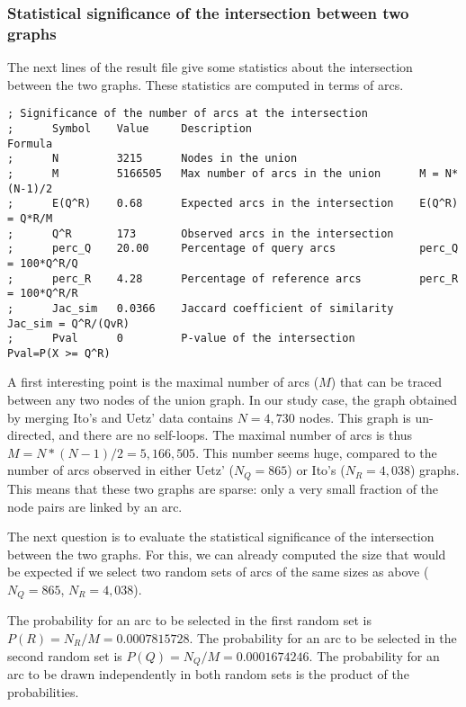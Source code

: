 \begin{enumerate}
\subsubsection{Statistical significance of the intersection between two graphs}

The next lines of the result file give some statistics about the
intersection between the two graphs. These statistics are computed in
terms of arcs.

\begin{footnotesize}
\begin{verbatim}
; Significance of the number of arcs at the intersection
;      Symbol    Value     Description                          Formula
;      N         3215      Nodes in the union                  
;      M         5166505   Max number of arcs in the union      M = N*(N-1)/2
;      E(Q^R)    0.68      Expected arcs in the intersection    E(Q^R) = Q*R/M
;      Q^R       173       Observed arcs in the intersection
;      perc_Q    20.00     Percentage of query arcs             perc_Q = 100*Q^R/Q
;      perc_R    4.28      Percentage of reference arcs         perc_R = 100*Q^R/R
;      Jac_sim   0.0366    Jaccard coefficient of similarity    Jac_sim = Q^R/(QvR)
;      Pval      0         P-value of the intersection          Pval=P(X >= Q^R)
\end{verbatim}
\end{footnotesize}

A first interesting point is the maximal number of arcs ($M$) that can
be traced between any two nodes of the union graph. In our study case,
the graph obtained by merging Ito's and Uetz' data contains $N=4,730$
nodes. This graph is un-directed, and there are no self-loops. The
maximal number of arcs is thus $M=N*(N-1)/2=5,166,505$. This number
seems huge, compared to the number of arcs observed in either Uetz'
($N_Q=865$) or Ito's ($N_R=4,038$) graphs. This means that these two graphs
are sparse: only a very small fraction of the node pairs are linked by
an arc.

The next question is to evaluate the statistical significance of the
intersection between the two graphs. For this, we can already computed
the size that would be expected if we select two random sets of arcs
of the same sizes as above ($N_Q=865$, $N_R=4,038$). 

The probability for an arc to be selected in the first random set is
$P(R) = N_R/M = 0.0007815728$. The probability for an arc to be
selected in the second random set is $P(Q) = N_Q/M =
0.0001674246$. The probability for an arc to be drawn independently in
both random sets is the product of the probabilities. 


\end{enumerate}
